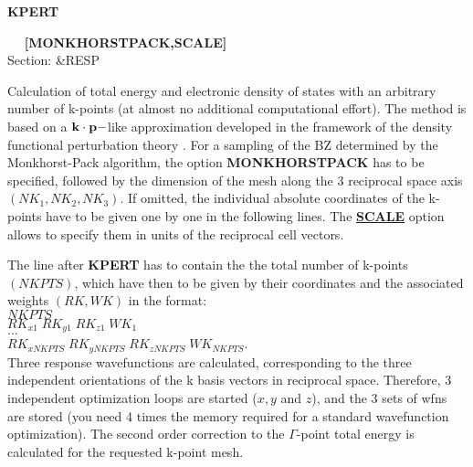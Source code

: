 \documentclass[twoside,10pt,titlepage,a4paper]{article}
\newcommand{\referto}[2]{\hyperlink{#1}{#2}}
\newcommand{\reflabel}[1]{\hypertarget{#1}}
\newcommand{\referto}[2]{\htmlref{#2}{#1}}
\newcommand{\reflabel}[1]{\label{#1}}
\newcommand{\keyword}[5]{%
\vspace{1.0cm}
\begin{minipage}{15cm}
\reflabel{#1}{\textbf{\large #1}}%
\index{#1}%
\ \textbf{#2}%
\ \textbf{#3}%
\ \textit{#4}%
     \hfill\\\smallskip
     {Section: #5}
     \hfill\\\smallskip\vskip 10pt
\end{minipage}
}%
\newcommand{\refkeyword}[1]{%
\referto{#1}{\textbf{#1}}%
\index{#1}%
}%
\newcommand{\desc}[1]{%
   \hspace*{\fill} \parbox{130mm}{\sloppy
                          {#1}%
                             }
     \hfill\\\smallskip
   }%
\newcommand{\desc}[1]{#1\vspace{1ex}}
\begin{document}
\keyword{KPERT}{}{[MONKHORSTPACK,SCALE]}{}{\&RESP}
\label{sec:kpert}
  \desc{Calculation of total energy and electronic density of states with
    an arbitrary number of k-points (at almost no additional
    computational effort).  The method is based on a
    ${\bf k}\cdot {\bf p}-$like approximation developed in the framework
    of the density functional perturbation theory \cite{mimp}.
    For a sampling of the BZ determined by the Monkhorst-Pack algorithm,
    the option {\bf MONKHORSTPACK}
    has to be specified, followed by the
    dimension of the mesh along the 3 reciprocal space axis
    $(NK_{1} , NK_{2} , NK_{3})$.
    If omitted, the individual absolute coordinates of the k-points have
    to be given one by one in the following lines.
    The  \refkeyword{SCALE} option allows to specify them in units of
    the reciprocal cell vectors.

    The line after {\bf KPERT} has to contain the
    the total number of k-points $(NKPTS)$, which have then to be given by
    their coordinates and the associated weights $(RK,WK)$
    in the format: \\
    $NKPTS$ \\
    $RK_{x1} \; RK_{y1} \; RK_{z1} \; WK_{1}$ \\
    $\dots$\\
    $RK_{x NKPTS} \; RK_{y NKPTS} \; RK_{z NKPTS} \; WK_{NKPTS}$. \\
    Three response wavefunctions are calculated, corresponding to
    the three independent orientations of the
    k basis vectors in reciprocal space.
    Therefore, 3 independent optimization loops are started ($x,y$ and $z$),
    and the 3 sets of wfns are stored (you need 4 times the
    memory required for a standard wavefunction optimization).
    The second order correction to the $\Gamma$-point total energy
    is calculated for the requested k-point mesh.

}
\end{document}
